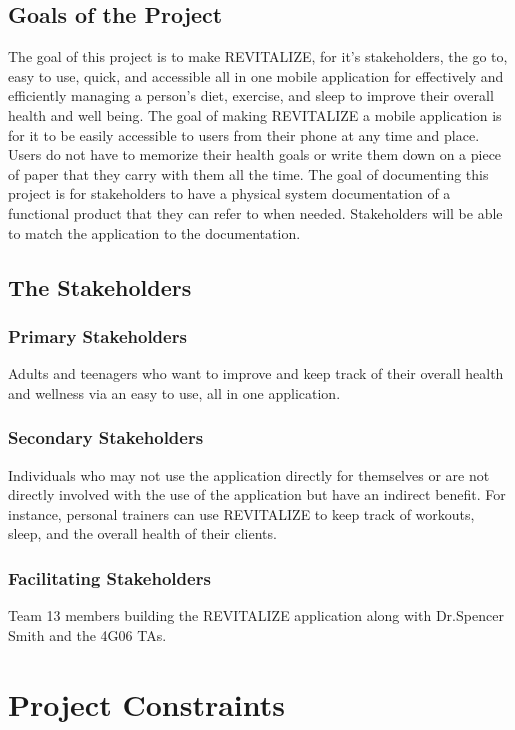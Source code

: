 \documentclass[12pt,letterpaper]{article}
\begin{document}
\subsection{Goals of the Project}
The goal of this project is to make REVITALIZE, for it's stakeholders, the go to, easy to use, quick, and accessible all in one mobile application for effectively and efficiently managing a person's diet, exercise, and sleep to improve their overall health and well being. The goal of making REVITALIZE a mobile application is for it to be easily accessible to users from their phone at any time and place. Users do not have to memorize their health goals or write them down on a piece of paper that they carry with them all the time. The goal of documenting this project is for stakeholders to have a physical system documentation of a functional product that they can refer to when needed. Stakeholders will be able to match the application to the documentation.

\subsection{The Stakeholders}

\subsubsection{Primary Stakeholders}
Adults and teenagers who want to improve and keep track of their overall health and wellness via an easy to use, all in one application.

\subsubsection{Secondary Stakeholders}
Individuals who may not use the application directly for themselves or are not directly involved with the use of the application but have an indirect benefit. For instance, personal trainers can use REVITALIZE to keep track of workouts, sleep, and the overall health of their clients.

\subsubsection{Facilitating Stakeholders}
Team 13 members building the REVITALIZE application along with Dr.Spencer Smith and the 4G06 TAs.

\section{Project Constraints}
\end{document}
